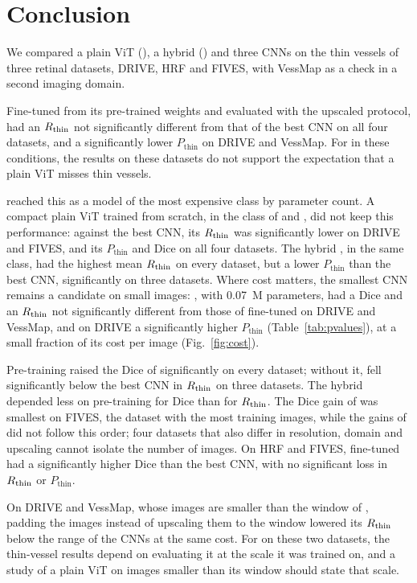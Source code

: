 \section{Conclusion}
\label{sec:conclusion}

We compared a plain ViT (\medsam{}), a hybrid (\litemedsam{}) and three CNNs on the thin vessels of three retinal datasets, DRIVE, HRF and FIVES, with VessMap as a check in a second imaging domain.

Fine-tuned from its pre-trained weights and evaluated with the upscaled protocol, \medsam{} had an $R_{\mathrm{thin}}$ not significantly different from that of the best CNN on all four datasets, and a significantly lower $P_{\mathrm{thin}}$ on DRIVE and VessMap. For \medsam{} in these conditions, the results on these datasets do not support the expectation that a plain ViT misses thin vessels.

\medsam{} reached this as a model of the most expensive class by parameter count. A compact plain ViT trained from scratch, in the class of \litemedsam{} and \convunext{}, did not keep this performance: against the best CNN, its $R_{\mathrm{thin}}$ was significantly lower on DRIVE and FIVES, and its $P_{\mathrm{thin}}$ and Dice on all four datasets. The hybrid \litemedsam{}, in the same class, had the highest mean $R_{\mathrm{thin}}$ on every dataset, but a lower $P_{\mathrm{thin}}$ than the best CNN, significantly on three datasets. Where cost matters, the smallest CNN remains a candidate on small images: \lwnet{}, with 0.07~M parameters, had a Dice and an $R_{\mathrm{thin}}$ not significantly different from those of fine-tuned \medsam{} on DRIVE and VessMap, and on DRIVE a significantly higher $P_{\mathrm{thin}}$ (Table~\ref{tab:pvalues}), at a small fraction of its cost per image (Fig.~\ref{fig:cost}).

Pre-training raised the Dice of \medsam{} significantly on every dataset; without it, \medsam{} fell significantly below the best CNN in $R_{\mathrm{thin}}$ on three datasets. The hybrid \litemedsam{} depended less on pre-training for Dice than for $R_{\mathrm{thin}}$. The Dice gain of \medsam{} was smallest on FIVES, the dataset with the most training images, while the gains of \litemedsam{} did not follow this order; four datasets that also differ in resolution, domain and upscaling cannot isolate the number of images. On HRF and FIVES, fine-tuned \medsam{} had a significantly higher Dice than the best CNN, with no significant loss in $R_{\mathrm{thin}}$ or $P_{\mathrm{thin}}$.

On DRIVE and VessMap, whose images are smaller than the window of \medsam{}, padding the images instead of upscaling them to the window lowered its $R_{\mathrm{thin}}$ below the range of the CNNs at the same cost. For \medsam{} on these two datasets, the thin-vessel results depend on evaluating it at the scale it was trained on, and a study of a plain ViT on images smaller than its window should state that scale.

